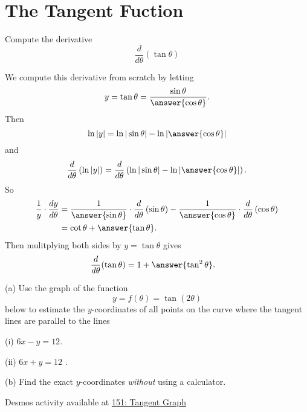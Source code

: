 \documentclass{ximera}
\begin{document}
\section*{The Tangent Fuction}

\begin{question}  \label{Ex:dsf9t5gg3w}
Compute the derivative
\[
     \frac{d}{d\theta} \left( \tan\theta  \right) 
\]

\begin{explanation}
We compute this derivative from scratch by letting 
\[
    y = \tan\theta = \frac{\sin\theta}{\answer{\cos\theta}} .
\]
Then
\[
   \ln |y| = \ln |\sin\theta| - \ln | \answer{\cos\theta}   |
\]
and
\[
      \frac{d}{d\theta} \left( \ln |y| \right) = \frac{d}{d\theta} \left( \ln |\sin\theta| - \ln | \answer{\cos\theta}| \right) .
\]
So
\begin{align*}
   \frac{1}{y} \cdot \frac{dy}{d\theta} &= \frac{1}{\answer{\sin\theta}} \cdot \frac{d}{d\theta}\left( \sin\theta \right) - \frac{1}{\answer{\cos\theta}} \cdot \frac{d}{d\theta}\left( \cos\theta \right) \\
                &= \cot\theta + \answer{\tan\theta} .
\end{align*}
Then mulitplying both sides by $y=\tan\theta$ gives
\begin{align*}
          \frac{d}{d\theta}(\tan \theta) &= 1 + \answer{\tan^2\theta} . 
\end{align*}

\end{explanation}
\end{question}

\begin{question}  \label{Qerdf4ghbhh}
(a) Use the graph of the function
\[
 y = f(\theta) = \tan (2\theta)
\]     
below to estimate the $y$-coordinates of all points on the curve where the tangent lines are parallel to the lines

(i)  $6x - y = 12$.

(ii) $6x + y = 12$ .

(b) Find the exact $y$-coordinates \emph{without} using a calculator.

\begin{onlineOnly}
    \begin{center}
\end{center}
\end{onlineOnly}

Desmos activity available at \href{https://www.desmos.com/calculator/obz6ghw3ej}{151: Tangent Graph}

\end{question}
\end{document}
